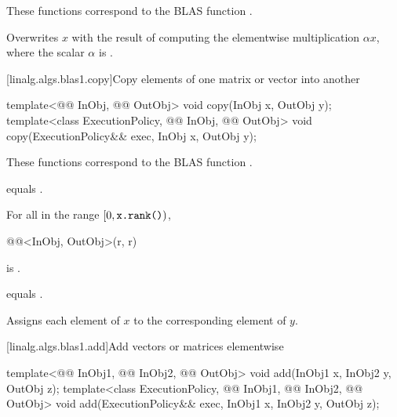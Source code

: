 \begin{itemdescr}
\pnum
\begin{note}
These functions correspond to the BLAS function .
\end{note}

\pnum
\effects
Overwrites $x$ with the result of
computing the elementwise multiplication $\alpha x$,
where the scalar $\alpha$ is .
\end{itemdescr}

[linalg.algs.blas1.copy]{Copy elements of one matrix or vector into another}

\begin{itemdecl}
template<@@ InObj, @@ OutObj>
  void copy(InObj x, OutObj y);
template<class ExecutionPolicy, @@ InObj, @@ OutObj>
  void copy(ExecutionPolicy&& exec, InObj x, OutObj y);
\end{itemdecl}

\begin{itemdescr}
\pnum
\begin{note}
These functions correspond to the BLAS function .
\end{note}

\pnum
\constraints
{} equals .

\pnum
\mandates
For all  in the range $[ 0, \texttt{\protect x.rank()})$,
\begin{codeblock}
@@<InObj, OutObj>(r, r)
\end{codeblock}
is .

\pnum
\expects
{} equals .

\pnum
\effects
Assigns each element of $x$ to the corresponding element of $y$.
\end{itemdescr}

[linalg.algs.blas1.add]{Add vectors or matrices elementwise}

\begin{itemdecl}
template<@@ InObj1, @@ InObj2, @@ OutObj>
  void add(InObj1 x, InObj2 y, OutObj z);
template<class ExecutionPolicy, @@ InObj1, @@ InObj2, @@ OutObj>
  void add(ExecutionPolicy&& exec,
           InObj1 x, InObj2 y, OutObj z);
\end{itemdecl}

